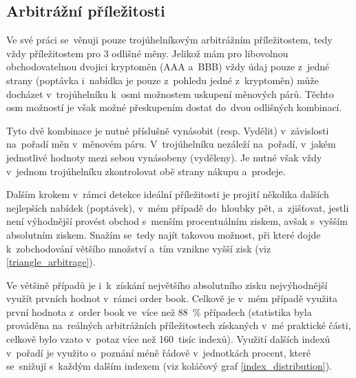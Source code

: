 \documentclass[thesis=B,czech]{FITthesis}[2019/03/21]
\begin{document}
\subsection{Arbitrážní příležitosti}
Ve své práci se~věnuji pouze trojúhelníkovým arbitrážním příležitostem, tedy vždy příležitostem pro 3 odlišné měny. Jelikož mám pro libovolnou obchodovatelnou dvojici kryptoměn (AAA a~BBB) vždy údaj pouze z~jedné strany (poptávka i~nabídka je pouze z~pohledu jedné z~kryptoměn) může docházet v~trojúhelníku k~osmi možnostem uskupení měnových párů. Těchto osm \linebreak možností je však možné přeskupením dostat do~dvou odlišných kombinací.

Tyto dvě kombinace je nutné příslušně vynásobit (resp. Vydělit) v~závislosti na~pořadí měn v~měnovém páru. V~trojúhelníku nezáleží na~pořadí, v~jakém jednotlivé hodnoty mezi sebou vynásobeny (vyděleny). Je nutné však vždy v~jednom trojúhelníku zkontrolovat obě strany nákupu a~prodeje.

Dalším krokem v~rámci detekce ideální příležitosti je projití několika dalších nejlepších nabídek (poptávek), v~mém případě do~hloubky pět, a~zjišťovat, jestli není výhodnější provést obchod s~menším procentuálním ziskem, avšak s~vyšším absolutním ziskem. Snažím se~tedy najít takovou možnost, při které dojde k~zobchodování většího množství a~tím vznikne vyšší zisk (viz \ref{triangle_arbitrage}).

Ve většině případů je i~k~získání největšího absolutního zisku nejvýhodnější využít prvních hodnot v~rámci order book. Celkově je v~mém případě využita první hodnota z~order book ve~více než 88~\% případech (statistika byla prováděna na~reálných arbitrážních příležitostech získaných v~mé praktické části, celkově bylo vzato v~potaz více než 160~tisíc indexů). Využití dalších indexů v~pořadí je využito o~poznání méně řádově v~jednotkách procent, které se~snižují s~každým dalším indexem (viz koláčový graf \ref{index_distribution}).
\end{document}
